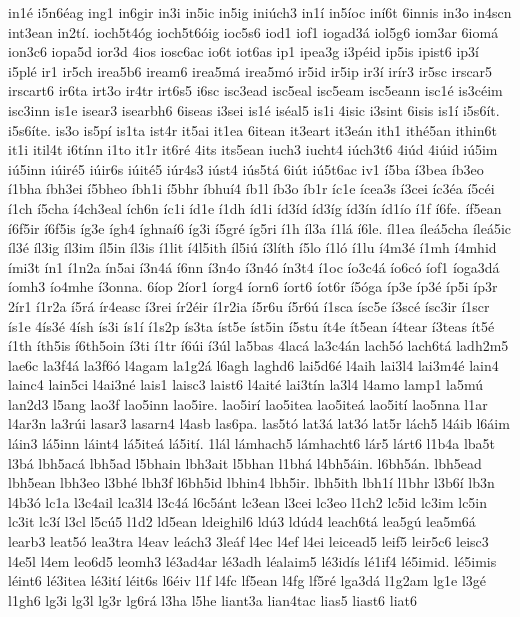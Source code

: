 {in1é
i5n6éag
ing1
in6gir
in3i
in5ic
in5ig
iniúch3
in1í
in5íoc
iní6t
6innis
in3o
in4scn
int3ean
in2tí.
ioch5t4óg
ioch5t6óig
ioc5s6
iod1
iof1
iogad3á
iol5g6
iom3ar
6iomá
ion3c6
iopa5d
ior3d
4ios
iosc6ac
io6t
iot6as
ip1
ipea3g
i3péid
ip5is
ipist6
ip3í
i5plé
ir1
ir5ch
irea5b6
iream6
irea5má
irea5mó
ir5id
ir5ip
ir3í
irír3
ir5sc
irscar5
irscart6
ir6ta
irt3o
ir4tr
irt6s5
i6sc
isc3ead
isc5eal
isc5eam
isc5eann
isc1é
is3céim
isc3inn
is1e
isear3
isearbh6
6iseas
i3sei
is1é
iséal5
is1i
4isic
i3sint
6isis
is1í
i5s6ít.
i5s6íte.
is3o
is5pí
is1ta
ist4r
it5ai
it1ea
6itean
it3eart
it3eán
ith1
ithé5an
ithin6t
it1i
itil4t
i6tínn
i1to
it1r
it6ré
4its
its5ean
iuch3
iucht4
iúch3t6
4iúd
4iúid
iú5im
iú5inn
iúiré5
iúir6s
iúité5
iúr4s3
iúst4
iús5tá
6iút
iú5t6ac
iv1
í5ba
í3bea
íb3eo
í1bha
íbh3ei
í5bheo
íbh1i
í5bhr
íbhuí4
íb1l
íb3o
íb1r
íc1e
ícea3s
í3cei
íc3éa
í5céi
í1ch
í5cha
í4ch3eal
ích6n
íc1i
íd1e
í1dh
íd1i
íd3íd
íd3íg
íd3ín
íd1ío
í1f
í6fe.
íf5ean
í6f5ir
í6f5is
íg3e
ígh4
íghnaí6
íg3i
í5gré
íg5ri
í1h
íl3a
í1lá
í6le.
íl1ea
íleá5cha
íleá5ic
íl3é
íl3ig
íl3im
íl5in
íl3is
í1lit
í4l5ith
íl5iú
í3líth
í5lo
í1ló
í1lu
í4m3é
í1mh
í4mhid
ími3t
ín1
í1n2a
ín5ai
í3n4á
í6nn
í3n4o
í3n4ó
ín3t4
í1oc
ío3c4á
ío6có
íof1
íoga3dá
íomh3
ío4mhe
í3onna.
6íop
2íor1
íorg4
íorn6
íort6
íot6r
í5óga
íp3e
íp3é
íp5i
íp3r
2ír1
í1r2a
í5rá
ír4easc
í3rei
ír2éir
í1r2ia
í5r6u
í5r6ú
í1sca
ísc5e
í3scé
ísc3ir
í1scr
ís1e
4ís3é
4ísh
ís3i
ís1í
í1s2p
ís3ta
íst5e
íst5in
í5stu
ít4e
ít5ean
í4tear
í3teas
ít5é
í1th
íth5is
í6th5oin
í3ti
í1tr
í6úi
í3úl
la5bas
4lacá
la3c4án
lach5ó
lach6tá
ladh2m5
lae6c
la3f4á
la3f6ó
l4agam
la1g2á
l6agh
laghd6
lai5d6é
l4aih
lai3l4
lai3m4é
lain4
lainc4
lain5ci
l4ai3né
lais1
laisc3
laist6
l4aité
lai3tín
la3l4
l4amo
lamp1
la5mú
lan2d3
l5ang
lao3f
lao5inn
lao5ire.
lao5irí
lao5itea
lao5iteá
lao5ití
lao5nna
l1ar
l4ar3n
la3rúi
lasar3
lasarn4
l4asb
las6pa.
las5tó
lat3á
lat3ó
lat5r
lách5
l4áib
l6áim
láin3
lá5inn
láint4
lá5iteá
lá5ití.
1lál
lámhach5
lámhacht6
lár5
lárt6
l1b4a
lba5t
l3bá
lbh5acá
lbh5ad
l5bhain
lbh3ait
l5bhan
l1bhá
l4bh5áin.
l6bh5án.
lbh5ead
lbh5ean
lbh3eo
l3bhé
lbh3f
l6bh5id
lbhin4
lbh5ir.
lbh5ith
lbh1í
l1bhr
l3b6í
lb3n
l4b3ó
lc1a
l3c4ail
lca3l4
l3c4á
l6c5ánt
lc3ean
l3cei
lc3eo
l1ch2
lc5id
lc3im
lc5in
lc3it
lc3í
l3cl
l5cú5
l1d2
ld5ean
ldeighil6
ldú3
ldúd4
leach6tá
lea5gú
lea5m6á
learb3
leat5ó
lea3tra
l4eav
leách3
3leáf
l4ec
l4ef
l4ei
leicead5
leif5
leir5c6
leisc3
l4e5l
l4em
leo6d5
leomh3
lé3ad4ar
lé3adh
léalaim5
lé3idís
lé1if4
lé5imid.
lé5imis
léint6
lé3itea
lé3ití
léit6s
l6éiv
l1f
l4fc
lf5ean
l4fg
lf5ré
lga3dá
l1g2am
lg1e
l3gé
l1gh6
lg3i
lg3l
lg3r
lg6rá
l3ha
l5he
liant3a
lian4tac
lias5
liast6
liat6
}
